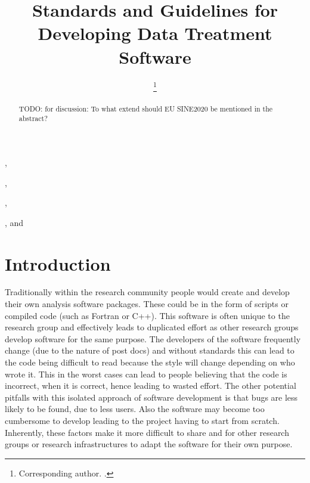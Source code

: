 \documentclass[jnr]{iosart2x}
\begin{document}
\begin{frontmatter}

\title{Standards and Guidelines for Developing Data Treatment Software}

\author[A]{ %
\thanks{Corresponding author. .}},
\author[A]{ },
\author[A]{ },
\author[B]{ },
and
\author[B]{ \snm{}\ead[label=e5]{}}

\address[A]{ ,}
\address[B]{ ,}

\begin{abstract}
TODO: for discussion: To what extend should EU SINE2020 be mentioned in the abstract?
\end{abstract}

\begin{keyword}
\end{keyword}

\end{frontmatter}


\section{Introduction}
\label{Introduction}

Traditionally within the research community people would create and develop their own analysis software packages.
These could be in the form of scripts or compiled code (such as Fortran or C++).
This software is often unique to the research group and effectively leads to duplicated effort as other research groups develop software for the same purpose.
The developers of the software frequently change (due to the nature of post docs) and without standards this can lead to the code being difficult to read because the style will change depending on who wrote it.
This in the worst cases can lead to people believing that the code is incorrect, when it is correct, hence leading to wasted effort.
The other potential pitfalls with this isolated approach of software development is that bugs are less likely to be found, due to less users.
Also the software may become too cumbersome to develop leading to the project having to start from scratch.
Inherently, these factors make it more difficult to share and for other research groups or research infrastructures to adapt the software for their own purpose.
\end{document}
